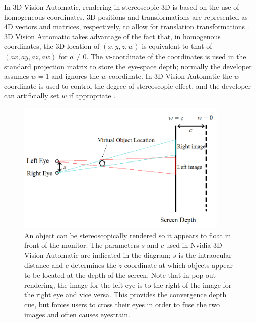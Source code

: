 \documentclass[pageno]{jpaper}
\begin{document}
In 3D Vision Automatic, rendering in stereoscopic 3D is based on the use of homogeneous coordinates. 3D positions and transformations are represented
as 4D vectors and matrices, respectively, to allow for translation transformations \cite{graphicstextbook}. 3D Vision Automatic takes advantage of the
fact that, in homogenous coordinates, the 3D location of $(x, y, z, w)$ is equivalent to that of $(ax, ay, az, aw)$ for $a \ne 0$. The $w$-coordinate
of the coordinates is used in the standard projection matrix to store the eye-space depth; normally the developer assumes
$w=1$ and ignores the $w$ coordinate. In 3D Vision Automatic the $w$ coordinate is used to control the degree of stereoscopic effect, and the
developer can artificially set $w$ if appropriate \cite{nvidia3dvision}.

\begin{figure}[h]
\centering
\includegraphics[width=0.9\textwidth]{figures/popout.png}
\caption{An object can be stereoscopically rendered so it appears to float in front of the monitor. The parameters $s$ and $c$ used in Nvidia 3D Vision Automatic are
indicated in the diagram; $s$ is the intraocular distance and $c$ determines the $z$ coordinate at which objects appear to be located at the depth of the screen.
Note that in pop-out rendering, the image for the left eye is to the right of the image for the right eye and vice versa. This provides the convergence depth cue,
but forces users to cross their eyes in order to fuse the two images and often causes eyestrain.}
\label{fig:stereo}
\end{figure}
\end{document}
